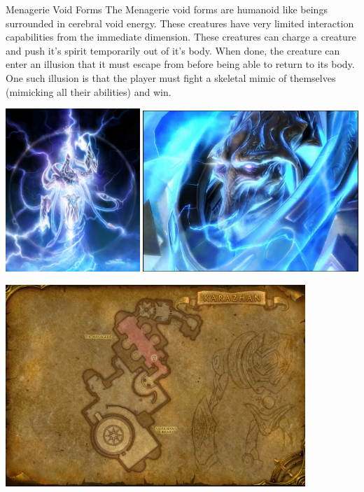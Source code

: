 \begin{commentbox}{Menagerie Void Forms}
	 The Menagerie void forms are humanoid like beings surrounded in cerebral void energy. These creatures have very limited interaction capabilities from the immediate dimension. These creatures can charge a creature and push it's spirit temporarily out of it's body. When done, the creature can enter an illusion that it must escape from before being able to return to its body. One such illusion is that the player must fight a skeletal mimic of themselves (mimicking all their abilities) and win.
	
	\begin{center}
		\includegraphics[width=0.38\textwidth]{img/Karazhan/ss26-hires.jpg} \includegraphics[width=0.61\textwidth]{img/Karazhan/9640b2f687a27a1a4cdab9704599e266.jpg}
	\end{center}
\end{commentbox}

\begin{center}
	\includegraphics[width=0.85\textwidth]{img/Karazhan/cropped-3457-9.jpg}
\end{center}

